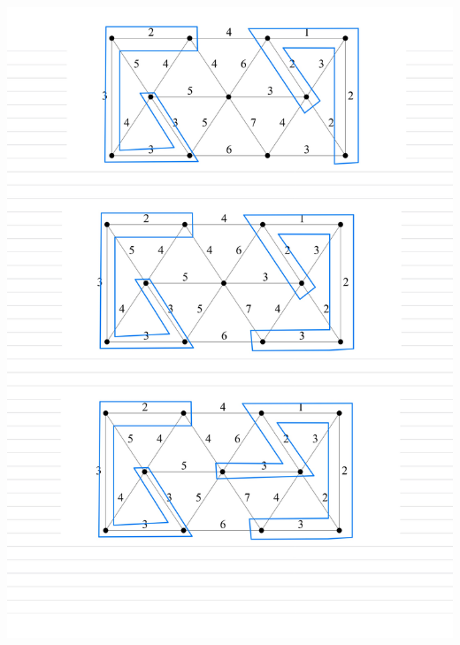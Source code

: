 \documentclass[]{article}
\theoremstyle{definition}
\begin{document}
    \begin{center}
        \includegraphics[width=14cm]{HW1-10.jpg}
    \end{center}
\end{document}
